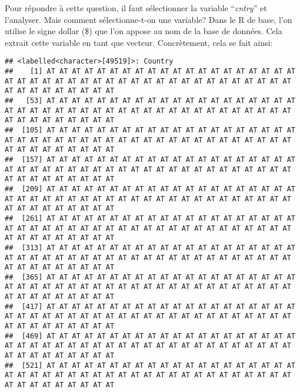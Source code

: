 \documentclass[
]{book}
\newenvironment{Shaded}{\begin{snugshade}}{\end{snugshade}}
\newcommand{\NormalTok}[1]{#1}
\newcommand{\SpecialCharTok}[1]{\textcolor[rgb]{0.00,0.00,0.00}{#1}}
\begin{document}
Pour répondre à cette question, il faut sélectionner la variable ``\emph{cntry}'' et l'analyser. Mais comment sélectionne-t-on une variable? Dans le R de base, l'on utilise le signe dollar (\$) que l'on appose au nom de la base de données. Cela extrait cette variable en tant que vecteur. Concrètement, cela se fait ainsi:

\begin{Shaded}
\end{Shaded}

\begin{verbatim}
## <labelled<character>[49519]>: Country
##    [1] AT AT AT AT AT AT AT AT AT AT AT AT AT AT AT AT AT AT AT AT AT AT AT AT AT AT AT AT AT AT AT AT AT AT AT AT AT AT AT AT AT AT AT AT AT AT AT AT AT AT AT AT
##   [53] AT AT AT AT AT AT AT AT AT AT AT AT AT AT AT AT AT AT AT AT AT AT AT AT AT AT AT AT AT AT AT AT AT AT AT AT AT AT AT AT AT AT AT AT AT AT AT AT AT AT AT AT
##  [105] AT AT AT AT AT AT AT AT AT AT AT AT AT AT AT AT AT AT AT AT AT AT AT AT AT AT AT AT AT AT AT AT AT AT AT AT AT AT AT AT AT AT AT AT AT AT AT AT AT AT AT AT
##  [157] AT AT AT AT AT AT AT AT AT AT AT AT AT AT AT AT AT AT AT AT AT AT AT AT AT AT AT AT AT AT AT AT AT AT AT AT AT AT AT AT AT AT AT AT AT AT AT AT AT AT AT AT
##  [209] AT AT AT AT AT AT AT AT AT AT AT AT AT AT AT AT AT AT AT AT AT AT AT AT AT AT AT AT AT AT AT AT AT AT AT AT AT AT AT AT AT AT AT AT AT AT AT AT AT AT AT AT
##  [261] AT AT AT AT AT AT AT AT AT AT AT AT AT AT AT AT AT AT AT AT AT AT AT AT AT AT AT AT AT AT AT AT AT AT AT AT AT AT AT AT AT AT AT AT AT AT AT AT AT AT AT AT
##  [313] AT AT AT AT AT AT AT AT AT AT AT AT AT AT AT AT AT AT AT AT AT AT AT AT AT AT AT AT AT AT AT AT AT AT AT AT AT AT AT AT AT AT AT AT AT AT AT AT AT AT AT AT
##  [365] AT AT AT AT AT AT AT AT AT AT AT AT AT AT AT AT AT AT AT AT AT AT AT AT AT AT AT AT AT AT AT AT AT AT AT AT AT AT AT AT AT AT AT AT AT AT AT AT AT AT AT AT
##  [417] AT AT AT AT AT AT AT AT AT AT AT AT AT AT AT AT AT AT AT AT AT AT AT AT AT AT AT AT AT AT AT AT AT AT AT AT AT AT AT AT AT AT AT AT AT AT AT AT AT AT AT AT
##  [469] AT AT AT AT AT AT AT AT AT AT AT AT AT AT AT AT AT AT AT AT AT AT AT AT AT AT AT AT AT AT AT AT AT AT AT AT AT AT AT AT AT AT AT AT AT AT AT AT AT AT AT AT
##  [521] AT AT AT AT AT AT AT AT AT AT AT AT AT AT AT AT AT AT AT AT AT AT AT AT AT AT AT AT AT AT AT AT AT AT AT AT AT AT AT AT AT AT AT AT AT AT AT AT AT AT AT AT

\end{verbatim}
\end{document}
